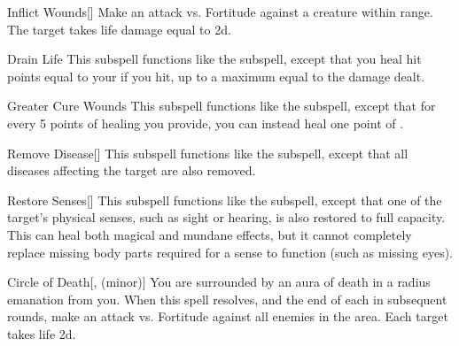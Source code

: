 \begin{ability}[\nth{1}]{Inflict Wounds}[]
Make an attack vs. Fortitude against a creature within \rngmed range.
\hit The target takes life damage equal to  \plus2d.
\end{ability}
\vspace{0.25em}



\begin{ability}[\nth{2}]{Drain Life}
This subspell functions like the  subspell, except that you heal hit points equal to your  if you hit, up to a maximum equal to the damage dealt.
\end{ability}
\vspace{0.25em}



\begin{ability}[\nth{2}]{Greater Cure Wounds}
This subspell functions like the  subspell, except that for every 5 points of healing you provide, you can instead heal one point of .
\end{ability}
\vspace{0.25em}



\begin{ability}[\nth{2}]{Remove Disease}[]
This subspell functions like the  subspell, except that all diseases affecting the target are also removed.
\end{ability}
\vspace{0.25em}



\begin{ability}[\nth{2}]{Restore Senses}[]
This subspell functions like the  subspell, except that one of the target's physical senses, such as sight or hearing, is also restored to full capacity.
This can heal both magical and mundane effects, but it cannot completely replace missing body parts required for a sense to function (such as missing eyes).
\end{ability}
\vspace{0.25em}



\begin{ability}[\nth{3}]{Circle of Death}[,  (minor)]
You are surrounded by an aura of death in a \areamed radius emanation from you.
When this spell resolves, and the end of each  in subsequent rounds, make an attack vs. Fortitude against all enemies in the area.
\hit Each target takes life  \minus2d.
\end{ability}
\vspace{0.25em}



